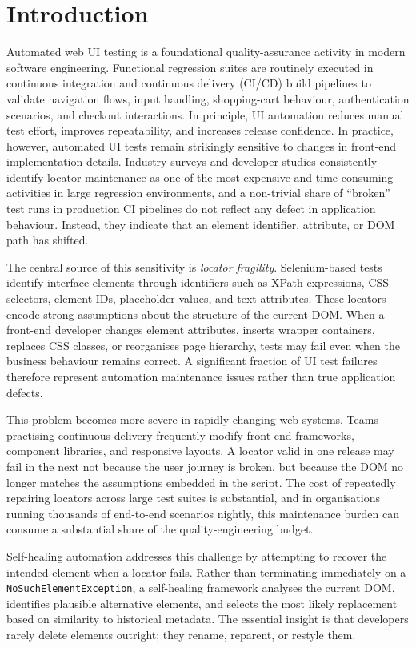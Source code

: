 \documentclass[12pt]{article}
\begin{document}
\section{Introduction}

Automated web UI testing is a foundational quality-assurance activity in modern software engineering. Functional regression suites are routinely executed in continuous integration and continuous delivery (CI/CD) build pipelines to validate navigation flows, input handling, shopping-cart behaviour, authentication scenarios, and checkout interactions. In principle, UI automation reduces manual test effort, improves repeatability, and increases release confidence. In practice, however, automated UI tests remain strikingly sensitive to changes in front-end implementation details. Industry surveys and developer studies consistently identify locator maintenance as one of the most expensive and time-consuming activities in large regression environments, and a non-trivial share of ``broken'' test runs in production CI pipelines do not reflect any defect in application behaviour. Instead, they indicate that an element identifier, attribute, or DOM path has shifted.

The central source of this sensitivity is \emph{locator fragility}. Selenium-based tests identify interface elements through identifiers such as XPath expressions, CSS selectors, element IDs, placeholder values, and text attributes. These locators encode strong assumptions about the structure of the current DOM. When a front-end developer changes element attributes, inserts wrapper containers, replaces CSS classes, or reorganises page hierarchy, tests may fail even when the business behaviour remains correct. A significant fraction of UI test failures therefore represent automation maintenance issues rather than true application defects.

This problem becomes more severe in rapidly changing web systems. Teams practising continuous delivery frequently modify front-end frameworks, component libraries, and responsive layouts. A locator valid in one release may fail in the next not because the user journey is broken, but because the DOM no longer matches the assumptions embedded in the script. The cost of repeatedly repairing locators across large test suites is substantial, and in organisations running thousands of end-to-end scenarios nightly, this maintenance burden can consume a substantial share of the quality-engineering budget.

Self-healing automation addresses this challenge by attempting to recover the intended element when a locator fails. Rather than terminating immediately on a \texttt{NoSuchElementException}, a self-healing framework analyses the current DOM, identifies plausible alternative elements, and selects the most likely replacement based on similarity to historical metadata. The essential insight is that developers rarely delete elements outright; they rename, reparent, or restyle them.
\end{document}
